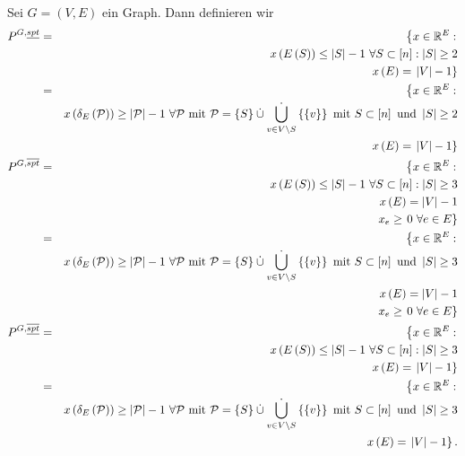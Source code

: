 \documentclass[10p,a4paper,BCOR = 12mm, DIV=15]{scrbook}
\begin{document}
\begin{Def}
Sei $G=\left(V, E\right)$ ein Graph. Dann definieren wir
\begin{eqnarray*}
P^{G, \underline{spt}} & = &  \left\{ x \in \mathbb{R}^E: \right. \nonumber \\
& & x\left(E\left(S\right)\right) \leq \left|S\right|-1\ \forall S \subset \left[n\right]: \left|S\right| \geq 2 \\
& & x\left(E\right) = \left.\left|V\right|-1 \right\} \nonumber \\
& = & \left\{ x \in \mathbb{R}^E: \right. \nonumber \\
& & x\left(\delta_E\left(\mathcal{P}\right)\right) \geq \left|\mathcal{P}\right|-1\ \forall \mathcal{P} \textnormal{ mit } \mathcal{P} = \left\{S\right\} \mathbin{\dot{\cup}} \mathop{\dot{\bigcup}}_{v \in V \backslash S} \left\{\left\{v\right\}\right\} \textnormal{ mit } S \subset \left[n\right] \textnormal{ und } \left|S\right| \geq 2 \\
& & x\left(E\right) = \left. \left|V\right|-1 \right\} \nonumber \\
P^{G, \overline{spt}} & = & \left\{ x \in \mathbb{R}^E: \right. \nonumber \\
& & x\left(E\left(S\right)\right) \leq \left|S\right|-1\ \forall S \subset \left[n\right]: \left|S\right| \geq 3 \\
& & x\left(E\right) = \left|V\right|-1 \nonumber \\
& & x_e \geq \left. 0\ \forall e \in E \right\} \nonumber \\
& = & \left\{ x \in \mathbb{R}^E: \right. \nonumber \\
& & x\left(\delta_E\left(\mathcal{P}\right)\right) \geq \left|\mathcal{P}\right|-1\ \forall \mathcal{P} \textnormal{ mit } \mathcal{P} = \left\{S\right\} \mathbin{\dot{\cup}} \mathop{\dot{\bigcup}}_{v \in V \backslash S} \left\{\left\{v\right\}\right\} \textnormal{ mit } S \subset \left[n\right] \textnormal{ und } \left|S\right| \geq 3 \\
& & x\left(E\right) = \left|V\right|-1 \\
& & x_e \geq \left. 0\ \forall e \in E \right\} \nonumber \\
P^{G, \overline{\underline{spt}}} & = & \left\{ x \in \mathbb{R}^E: \right. \nonumber \\
& & x\left(E\left(S\right)\right) \leq \left|S\right|-1\ \forall S \subset \left[n\right]: \left|S\right| \geq 3 \\
& & x\left(E\right) =  \left.\left|V\right|-1 \nonumber \right\} \nonumber \\
& = & \left\{ x \in \mathbb{R}^E: \right. \nonumber \\
& & x\left(\delta_E\left(\mathcal{P}\right)\right) \geq \left|\mathcal{P}\right|-1\ \forall \mathcal{P} \textnormal{ mit } \mathcal{P} = \left\{S\right\} \mathbin{\dot{\cup}} \mathop{\dot{\bigcup}}_{v \in V \backslash S} \left\{\left\{v\right\}\right\} \textnormal{ mit } S \subset \left[n\right] \textnormal{ und } \left|S\right| \geq 3 \\
& & x\left(E\right) = \left.\left|V\right|-1 \right\}. \nonumber
\end{eqnarray*}
\end{Def}
\end{document}
